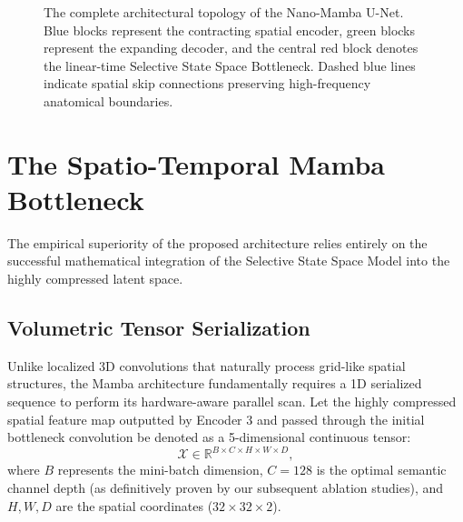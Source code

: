 \begin{figure}[hbt!]
{
}
\caption{The complete architectural topology of the Nano-Mamba U-Net. Blue blocks represent the contracting spatial encoder, green blocks represent the expanding decoder, and the central red block denotes the linear-time Selective State Space Bottleneck. Dashed blue lines indicate spatial skip connections preserving high-frequency anatomical boundaries.}
\label{fig:full_architecture}
\end{figure}

\section{The Spatio-Temporal Mamba Bottleneck}
The empirical superiority of the proposed architecture relies entirely on the successful mathematical integration of the Selective State Space Model \cite{gu2023mamba} into the highly compressed latent space.

\subsection{Volumetric Tensor Serialization}
Unlike localized 3D convolutions that naturally process grid-like spatial structures, the Mamba architecture fundamentally requires a 1D serialized sequence to perform its hardware-aware parallel scan. Let the highly compressed spatial feature map outputted by Encoder 3 and passed through the initial bottleneck convolution be denoted as a 5-dimensional continuous tensor:
\begin{equation}
    \mathcal{X} \in \mathbb{R}^{B \times C \times H \times W \times D},
\end{equation}
where $B$ represents the mini-batch dimension, $C=128$ is the optimal semantic channel depth (as definitively proven by our subsequent ablation studies), and $H, W, D$ are the spatial coordinates ($32 \times 32 \times 2$). 

